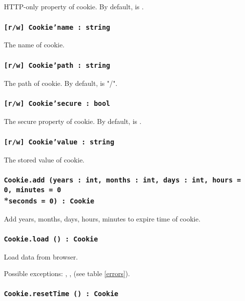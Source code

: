 HTTP-only property of cookie. By default, is \false.

\subsubsection{\texttt{[r/w] Cookie'name : string}}

The name of cookie.

\subsubsection{\texttt{[r/w] Cookie'path : string}}

The path of cookie. By default, is "/".

\subsubsection{\texttt{[r/w] Cookie'secure : bool}}

The secure property of cookie. By default, is \false.

\subsubsection{\texttt{[r/w] Cookie'value : string}}

The stored value of cookie.

\subsubsection{\texttt{Cookie.add (years : int, months : int, days : int, hours = 0, minutes = 0}\\*\noindent\texttt{seconds = 0) : Cookie}}

Add years, months, days, hours, minutes to expire time of cookie.

\subsubsection{\texttt{Cookie.load () : Cookie}}

Load \cookie{} data from browser.

Possible exceptions: , ,  (see table \ref{errors}).

\subsubsection{\texttt{Cookie.resetTime () : Cookie}}

